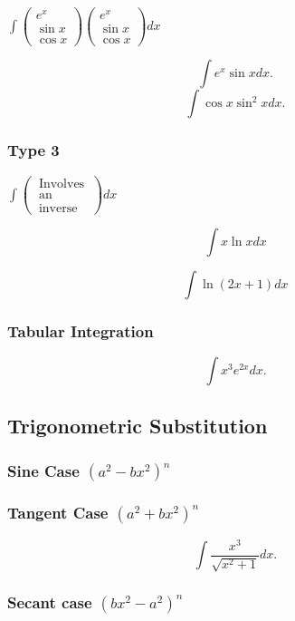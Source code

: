 \documentclass[a4paper,11pt,twoside]{report}
\begin{document}
$\int \begin{pmatrix} e^{x} \\ \sin x  \\ \cos x \end{pmatrix} \begin{pmatrix} e^{x} \\ \sin x  \\ \cos x \end{pmatrix} dx$

\[
\int e^{x} \sin x dx
.\]
\[
\int \cos x \sin^2 x dx
.\]

\subsubsection{Type 3}%
\label{ssub:type_3}

$\int \begin{pmatrix} \:\text{Involves}\: \\ \:\text{an}\: \\ \:\text{inverse}\: \end{pmatrix} dx $

\[ \int x \ln x dx\]

\[\int \ln (2x+1) dx\]


\subsubsection{Tabular Integration}%
\label{ssub:tabular_integration}

\[
\int x^3 e^{2x}dx
.\]
\subsection{Trigonometric Substitution}%
\label{sub:trigonometric_substitution}
\subsubsection{Sine Case $(a^2-bx^2)^{n}$}%
\label{ssub:sine_case}

\subsubsection{Tangent Case $(a^2+bx^2)^{n}$}%
\label{ssub:tangent_case}
\[
\int \frac{x^3}{\sqrt{x^2+1} } dx
.\]

\subsubsection{Secant case $(bx^2-a^2)^{n}$}%
\label{ssub:secant_case}












\newpage
\end{document}

